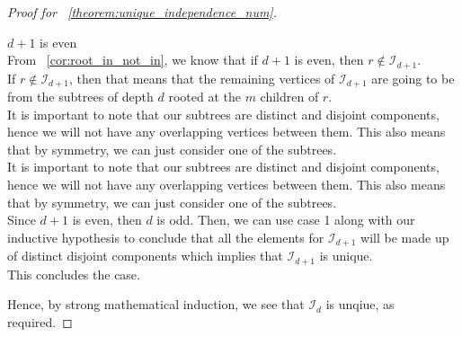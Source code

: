 \documentclass{amsart}
\theoremstyle{definition}
\begin{document}
\begin{proof}[Proof for ~\ref{theorem:unique_independence_num}]
\begin{caseof}
	\item $d + 1$ is even \\
		From ~\ref{cor:root_in_not_in}, we know that if $d + 1$ is even, then $r \not\in \mathcal{I}_{d + 1}$. 
\\
		If $r \not\in \mathcal{I}_{d + 1}$, then that means that the remaining vertices of $\mathcal{I}_{d+1}$ are going to be from the subtrees of depth $d$ rooted at the $m$ children of $r$.
\\
		It is important to note that our subtrees are distinct and disjoint components, hence we will not have any overlapping vertices between them. This also means that by symmetry, we can just consider one of the subtrees.
\\
		It is important to note that our subtrees are distinct and disjoint components, hence we will not have any overlapping vertices between them. This also means that by symmetry, we can just consider one of the subtrees.
\\
		Since $d + 1$ is even, then $d$ is odd. Then, we can use case 1 along with our inductive hypothesis to conclude that all the elements for $\mathcal{I}_{d + 1}$ will be made up of distinct disjoint components which implies that $\mathcal{I}_{d+1}$ is unique.
\\
		This concludes the case.
	\end{caseof}

	Hence, by strong mathematical induction, we see that $\mathcal{I}_{d}$ is unqiue, as required.
\end{proof}
\end{document}
